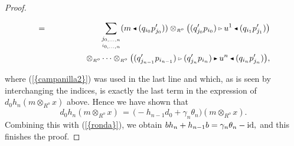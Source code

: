 \documentclass[reqno, a4paper, 10pt]{amsart}
\numberwithin{equation}{section}
\theoremstyle{plain}
\theoremstyle{definition}
\theoremstyle{remark}
\begin{document}
\begin{proof}
\begin{footnotesize}
\begin{eqnarray*}
&= & 
\quad   \underset{\underset{i_{0,\ldots,{n}}}{j_{0,\ldots,{n}}}}{\sum} (m {{\,\raise1pt\hbox{$\scriptscriptstyle{\blacktriangleleft}$} \, }} (q_{i_0}p'_{j_0}) )
\otimes_{{\scriptscriptstyle{{R^{o}}}}} {\big( { (q'_{j_0}p_{i_0}) {{\,\raise1pt\hbox{$\scriptscriptstyle{\rhd}$} \, }} u^1 {{\,\raise1pt\hbox{$\scriptscriptstyle{\blacktriangleleft}$} \, }} (q_{i_1}p'_{j_1}) } \big)}
\\ & &  
\qquad \qquad
\otimes_{{\scriptscriptstyle{{R^{o}}}}}  \cdots \otimes_{{\scriptscriptstyle{{R^{o}}}}} 
\big((q'_{j_{n-1}}p_{i_{n-1}}) {{\,\raise1pt\hbox{$\scriptscriptstyle{\rhd}$} \, }} (q'_{j_n}p_{i_n}) {{\,\raise1pt\hbox{$\scriptscriptstyle{\blacktriangleright}$} \, }} u^n {{\,\raise1pt\hbox{$\scriptscriptstyle{\blacktriangleleft}$} \, }}   (q_{i_n}p'_{j_n}) \big),
\end{eqnarray*}
\end{footnotesize}
where {{\rm (}\ref{{campanilla2}}{\rm )}} was used in the last line and which, as is seen by interchanging the indices, is exactly the last term in the expression of $d_{0} h_n(m \otimes_{{\scriptscriptstyle{{R^{o}}}}} x)$ above. Hence we have shown that 
$$
d_{0} h_n(m \otimes_{{\scriptscriptstyle{{R^{o}}}}} x) \,  =\, \big(-h_{n-1} d_0 +  \gamma_n \theta_n\big)(m \otimes_{{\scriptscriptstyle{{R^{o}}}}} x). 
$$
Combining this with {{\rm (}\ref{{ronda}}{\rm )}}, we obtain
$
bh_n + h_{n-1}b = \gamma_n \theta_n - {{\rm id}},
$
and this finishes the proof.
\end{proof}
\end{document}
